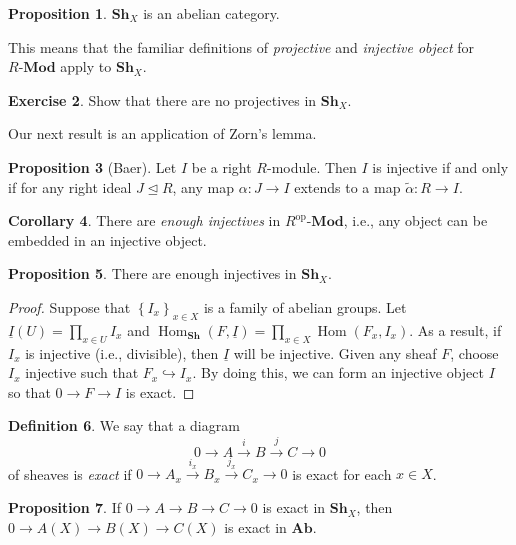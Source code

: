 \documentclass[10pt,letterpaper,cm]{nupset}
\theoremstyle{definition}
\newtheorem{definition}{Definition}[subsection]
\theoremstyle{theorem}
\newtheorem{prop}[definition]{Proposition}
\newtheorem{corollary}[definition]{Corollary}
\newtheorem{exercise}[definition]{Exercise}
\theoremstyle{remark}
\newcommand{\1}{\mathbb{1}}
\newcommand{\0}{\vec 0}
\DeclareMathOperator{\Hom}{Hom}
\DeclareMathOperator{\op}{op}
\begin{document}
\begin{prop}
$\mathbf{Sh}_{X}$ is an abelian category. 
\end{prop}

This means that the familiar definitions of \textit{projective} and \textit{injective object} for $R\text{-}\mathbf{Mod}$ apply to $\mathbf{Sh}_{X}$.

\begin{exercise}
Show that there are no projectives in $\mathbf{Sh}_{X}$.
\end{exercise}

\smallskip

Our next result is an application of Zorn's lemma.

\begin{prop}[Baer]
Let $I$ be a right $R$-module. Then $I$ is injective if and only if for any right ideal $J \unlhd R$, any map $\alpha : J \to I$ extends to a map $\tilde{\alpha} : R \to I$.
\end{prop}

\begin{corollary}
There are \textit{enough injectives} in $R^{\op}\text{-}\mathbf{Mod}$, i.e., any object can be embedded in an injective object. 
\end{corollary}

\begin{prop}
There are enough injectives in $\mathbf{Sh}_{X}$. 
\end{prop}
\begin{proof}
Suppose that $\left\{I_x\right\}_{x\in X}$ is a family of abelian groups. Let $\underline{I}(U) = \prod_{x\in U} I_x$ and $\Hom_{\mathbf{Sh}}(F, \underline{I}) = \prod_{x\in X} \Hom(F_x, I_x)$. As a result, if $I_x$ is injective (i.e., divisible), then $\underline{I}$ will be injective. Given any sheaf $F$, choose $I_x$ injective such that $F_x \hookrightarrow I_x$. By doing this, we can form an injective object $I$ so that $0 \to F \to I$ is exact. 
\end{proof}

\begin{definition}
We say that a diagram  $$  0 \to A \overset{i}{\longrightarrow} B \overset{j}{\longrightarrow} C \to 0  $$ of sheaves is \textit{exact} if $0 \longrightarrow A_x  \overset{i_x}{\longrightarrow}  B_x  \overset{j_x}{\longrightarrow}  C_x \longrightarrow 0$ is exact for each $x\in X$. 
\end{definition}

\begin{prop}
If $0 \to A \to B \to C \to 0$ is exact in $\mathbf{Sh}_{X}$, then $0 \to A(X) \to B(X) \to C(X)$ is exact in $\mathbf{Ab}$.
\end{prop}
\end{document}

